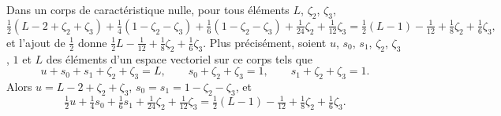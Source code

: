 \begin{encadre}
\begin{enonce}
Dans un corps de caractéristique nulle, pour tous éléments $L$, $\zeta_2$, $\zeta_3$,
\[ \tfrac12(L - 2 + \zeta_2 + \zeta_3) + \tfrac14(1 - \zeta_2 - \zeta_3) + \tfrac16(1 - \zeta_2 - \zeta_3) + \tfrac1{24}\zeta_2 + \tfrac1{12}\zeta_3 = \tfrac12(L - 1) - \tfrac1{12} + \tfrac18\zeta_2 + \tfrac16\zeta_3 , \]
et l'ajout de $\tfrac12$ donne $\tfrac12 L - \tfrac1{12} + \tfrac18\zeta_2 + \tfrac16\zeta_3$. Plus précisément, soient $u$, $s_0$, $s_1$, $\zeta_2$, $\zeta_3$, $1$ et $L$ des éléments d'un espace vectoriel sur ce corps tels que
\[ u + s_0 + s_1 + \zeta_2 + \zeta_3 = L, \qquad s_0 + \zeta_2 + \zeta_3 = 1, \qquad s_1 + \zeta_2 + \zeta_3 = 1 . \]
Alors $u = L - 2 + \zeta_2 + \zeta_3$, $s_0 = s_1 = 1 - \zeta_2 - \zeta_3$, et
\[ \tfrac12 u + \tfrac14 s_0 + \tfrac16 s_1 + \tfrac1{24}\zeta_2 + \tfrac1{12}\zeta_3 = \tfrac12(L - 1) - \tfrac1{12} + \tfrac18\zeta_2 + \tfrac16\zeta_3 . \]
\end{enonce}
\end{encadre}
